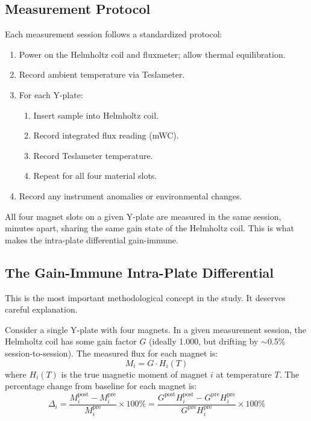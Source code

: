 \documentclass[11pt,letterpaper]{article}
\begin{document}
\subsection{Measurement Protocol}

Each measurement session follows a standardized protocol:
\begin{enumerate}
    \item Power on the Helmholtz coil and fluxmeter; allow thermal equilibration.
    \item Record ambient temperature via Teslameter.
    \item For each Y-plate:
    \begin{enumerate}
        \item Insert sample into Helmholtz coil.
        \item Record integrated flux reading (mWC).
        \item Record Teslameter temperature.
        \item Repeat for all four material slots.
    \end{enumerate}
    \item Record any instrument anomalies or environmental changes.
\end{enumerate}

All four magnet slots on a given Y-plate are measured
in the same session, minutes apart, sharing the same gain state of the
Helmholtz coil. This is what makes the intra-plate differential gain-immune.

\subsection{The Gain-Immune Intra-Plate Differential}
\label{sec:gain_immune}

This is the most important methodological concept in the study. It deserves
careful explanation.

Consider a single Y-plate with four magnets. In a given measurement session,
the Helmholtz coil has some gain factor $G$ (ideally 1.000, but drifting by
$\sim$0.5\% session-to-session). The measured flux for each magnet is:
\begin{equation}
    M_i = G \cdot H_i(T)
\end{equation}
where $H_i(T)$ is the true magnetic moment of magnet $i$ at temperature $T$.
The percentage change from baseline for each magnet is:
\begin{equation}
    \Delta_i = \frac{M_i^\mathrm{post} - M_i^\mathrm{pre}}{M_i^\mathrm{pre}} \times 100\%
    = \frac{G^\mathrm{post} H_i^\mathrm{post} - G^\mathrm{pre} H_i^\mathrm{pre}}{G^\mathrm{pre} H_i^\mathrm{pre}} \times 100\%
\end{equation}
\end{document}
